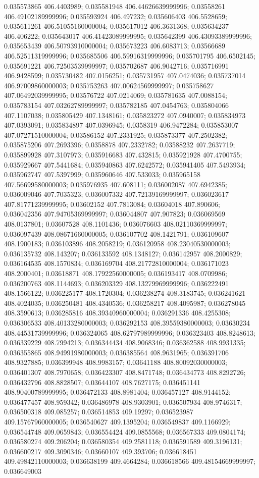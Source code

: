 0.035573865 406.4403989; 0.035581948 406.44626639999996; 0.03558261 406.49102189999996; 0.035593924 406.497232; 0.035606403 406.5528659; 0.035611261 406.51055160000004; 0.035617012 406.3631368; 0.035634237 406.406222; 0.035643017 406.41423089999995; 0.035642399 406.43093389999996; 0.035653439 406.50793910000004; 0.035673223 406.6083713; 0.03566689 406.52511319999996; 0.035685506 406.59916319999996; 0.035701795 406.6502145; 0.035691221 406.72503539999997; 0.035702687 406.9042716; 0.035716991 406.9428599; 0.035730482 407.0156251; 0.035731957 407.0474036; 0.035737014 406.97009860000003; 0.035753263 407.00624569999997; 0.035758627 407.06492039999995; 0.03576722 407.0214069; 0.035781635 407.0088154; 0.035783154 407.03262789999997; 0.035782185 407.0454763; 0.035804066 407.1107038; 0.035805429 407.1348161; 0.035823272 407.0940007; 0.035834973 407.0393091; 0.035834897 407.0396945; 0.0358319 406.9472284; 0.035853007 407.07271510000004; 0.03586152 407.2331925; 0.035873377 407.2502382; 0.035875206 407.2693396; 0.0358878 407.2332782; 0.03588232 407.2637719; 0.035899928 407.3107973; 0.035916683 407.432815; 0.035921928 407.4700755; 0.035929667 407.5441684; 0.035940863 407.6242572; 0.035941405 407.5493934; 0.035962747 407.5397999; 0.035960646 407.533033; 0.035965158 407.56699580000003; 0.035976935 407.608111; 0.036002087 407.6942385; 0.036009046 407.7035323; 0.036007332 407.72139169999997; 0.036023617 407.81771239999995; 0.03602152 407.7813084; 0.03604018 407.890606; 0.036042356 407.94705369999997; 0.036044807 407.907823; 0.036069569 408.0137801; 0.03607528 408.1101436; 0.036076603 408.02110369999997; 0.036097439 408.08671660000005; 0.036107702 408.1421791; 0.036109607 408.1900183; 0.036103896 408.2058219; 0.036120958 408.23040530000003; 0.036135732 408.143207; 0.036133592 408.1348127; 0.036142957 408.2000829; 0.036164535 408.1570834; 0.036169704 408.21772810000004; 0.036171023 408.2000401; 0.03618871 408.17922560000005; 0.036193417 408.0709986; 0.036200763 408.1144693; 0.036203329 408.13279969999996; 0.036222491 408.1566122; 0.036225177 408.1720304; 0.036238274 408.3183745; 0.036241621 408.4024035; 0.036250481 408.4340536; 0.036258217 408.4095987; 0.036278045 408.3590613; 0.036285816 408.39340960000004; 0.036291336 408.4255308; 0.036306533 408.40133280000003; 0.036292153 408.39559380000003; 0.03630234 408.44531739999996; 0.036324065 408.62797989999996; 0.036323403 408.8248613; 0.036339229 408.7994213; 0.036344434 408.9068346; 0.036362588 408.9931335; 0.036355865 408.94991980000003; 0.036385564 408.9631965; 0.036391706 408.9327885; 0.036399948 408.9983157; 0.03641188 408.80092030000003; 0.036401307 408.7970658; 0.036423307 408.8471748; 0.036434773 408.8292726; 0.036432796 408.8828507; 0.03644107 408.7627175; 0.036451141 408.90400789999995; 0.036472133 408.8981404; 0.036457127 408.9144152; 0.036477457 408.959342; 0.036486978 408.9303901; 0.036507934 408.9746317; 0.036500318 409.085257; 0.036514853 409.19297; 0.036523987 409.15767960000005; 0.036540627 409.1395204; 0.036549837 409.1166929; 0.036544748 409.0659843; 0.036554424 409.0855568; 0.036567333 409.0804174; 0.036580274 409.206204; 0.036580354 409.2581118; 0.036591589 409.3196131; 0.036600217 409.3090346; 0.03660107 409.393706; 0.036618451 409.49842110000003; 0.036638199 409.4664284; 0.036618566 409.48154669999997; 0.036649003 